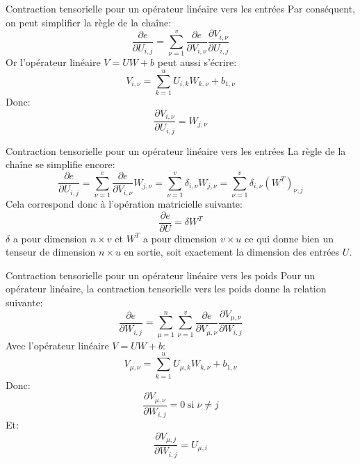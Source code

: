 \begin{frame}{Contraction tensorielle pour un opérateur linéaire vers les entrées}
	Par conséquent,  on peut simplifier la règle de la chaîne:
	\begin{equation*}
		\frac{\partial{e}}{\partial{U_{i,j}}} = \sum_{\nu=1}^v \frac{\partial{e}}{\partial{V_{i,\nu}}} \frac{\partial{V_{i,\nu}}}{\partial{U_{i,j}}}
	\end{equation*}
	\pause
	Or l'opérateur linéaire $V = U W + b$ peut aussi s'écrire:
	\begin{equation*}
		V_{i,\nu} = \sum_{k=1}^u U_{i, k} W_{k, \nu} + b_{1,\nu}
	\end{equation*}
	Donc:
	\begin{equation*}
		\frac{\partial{V_{i,\nu}}}{\partial{U_{i,j}}} = W_{j, \nu}
	\end{equation*}
\end{frame}

\begin{frame}{Contraction tensorielle pour un opérateur linéaire vers les entrées}
	La règle de la chaîne se simplifie encore:
	\begin{equation*}
		\frac{\partial{e}}{\partial{U_{i,j}}} = \sum_{\nu=1}^v \frac{\partial{e}}{\partial{V_{i,\nu}}} W_{j, \nu} = \sum_{\nu=1}^v \delta_{i,\nu} W_{j, \nu} = \sum_{\nu=1}^v \delta_{i,\nu} \left(W^T\right)_{\nu, j}
	\end{equation*}
	\pause
	Cela correspond donc à l'opération matricielle suivante:
	\begin{equation*}
		\frac{\partial{e}}{\partial{U}} = \delta W^T
	\end{equation*}
	$\delta$ a pour dimension $n \times v$ et $W^T$ a pour dimension $v \times u$ ce qui donne bien un tenseur de dimension $n \times u$ en sortie, soit exactement la dimension des entrées $U$. 
\end{frame}

\begin{frame}{Contraction tensorielle pour un opérateur linéaire vers les poids}
	Pour un opérateur linéaire, la contraction tensorielle vers les poids donne la relation suivante:
	\begin{equation*}
		\frac{\partial{e}}{\partial{W_{i,j}}} = \sum_{\mu=1}^n \sum_{\nu=1}^v \frac{\partial{e}}{\partial{V_{\mu,\nu}}} \frac{\partial{V_{\mu,\nu}}}{\partial{W_{i,j}}}
	\end{equation*}
	\pause
	Avec l'opérateur linéaire $V = U W + b$:
	\begin{equation*}
		V_{\mu,\nu} = \sum_{k=1}^u U_{\mu, k} W_{k, \nu} + b_{1,\nu}
	\end{equation*}
	\pause
	Donc:
	\begin{equation*}
		\frac{\partial{V_{\mu,\nu}}}{\partial{W_{i,j}}} = 0 \; \text{si} \; \nu \ne j
	\end{equation*}
	\pause
	Et:
	\begin{equation*}
		\frac{\partial{V_{\mu,j}}}{\partial{W_{i,j}}} = U_{\mu,i}
	\end{equation*}	
\end{frame}

